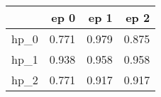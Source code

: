 \begin{tabular}{lrrr}
\toprule
{} &   ep 0 &   ep 1 &   ep 2 \\
\midrule
hp\_0 &  0.771 &  0.979 &  0.875 \\
hp\_1 &  0.938 &  0.958 &  0.958 \\
hp\_2 &  0.771 &  0.917 &  0.917 \\
\bottomrule
\end{tabular}
